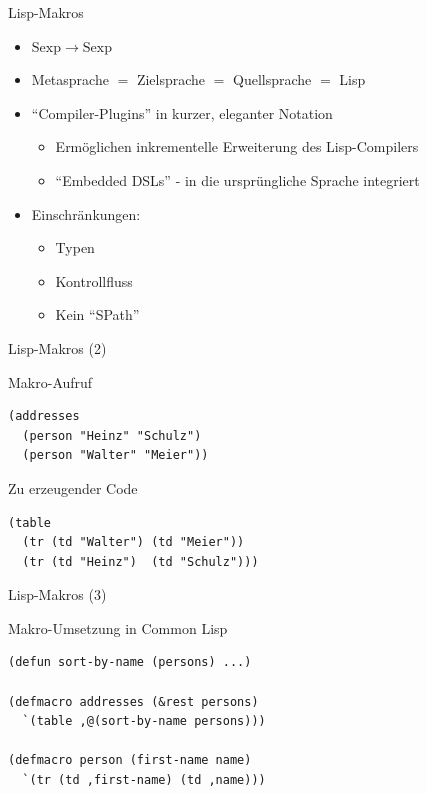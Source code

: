 \documentclass{beamer}
\newcommand\ato{\rightarrow} %
\begin{document}
\begin{frame}[fragile]{Lisp-Makros}
  \begin{itemize}
  \item $\mathrm{Sexp} \ato \mathrm{Sexp}$
  \item Metasprache $=$ Zielsprache $=$ Quellsprache $=$ Lisp
  \item ``Compiler-Plugins'' in kurzer, eleganter Notation
    \begin{itemize}
    \item Ermöglichen inkrementelle Erweiterung des Lisp-Compilers
    \item ``Embedded DSLs'' - in die ursprüngliche Sprache integriert
    \end{itemize}
  \item Einschränkungen:
    \begin{itemize}
    \item Typen
    \item Kontrollfluss
    \item Kein ``SPath''
    \end{itemize}
  \end{itemize}
\end{frame}

\begin{frame}[fragile]{Lisp-Makros (2)}
  \begin{block}{Makro-Aufruf}
\begin{verbatim}
(addresses
  (person "Heinz" "Schulz")
  (person "Walter" "Meier"))
\end{verbatim}
  \end{block}
  \begin{block}{Zu erzeugender Code}
\begin{verbatim}
(table
  (tr (td "Walter") (td "Meier"))
  (tr (td "Heinz")  (td "Schulz")))
\end{verbatim}
  \end{block}
\end{frame}

\begin{frame}[fragile]{Lisp-Makros (3)}
  \begin{block}{Makro-Umsetzung in Common Lisp}
\begin{verbatim}
(defun sort-by-name (persons) ...)

(defmacro addresses (&rest persons)
  `(table ,@(sort-by-name persons)))

(defmacro person (first-name name)
  `(tr (td ,first-name) (td ,name)))
\end{verbatim}
  \end{block}
\end{frame}
\end{document}
